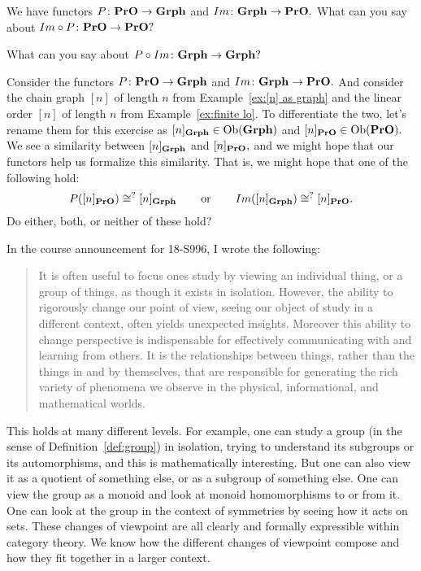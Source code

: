 \documentclass[../main/CT4S-EN-RU]{subfiles}
\begin{document}
\begin{exerciseRUS}
\end{exerciseRUS}

\begin{exerciseENG}
We have functors $P\colon{\mathbf{PrO}}\rightarrow{\mathbf{Grph}}$ and $Im\colon{\mathbf{Grph}}\rightarrow{\mathbf{PrO}}.$
\sexc What can you say about $Im\circ P\colon{\mathbf{PrO}}\rightarrow{\mathbf{PrO}}?$
\item What can you say about $P\circ Im\colon{\mathbf{Grph}}\rightarrow{\mathbf{Grph}}?$
\endsexc
\end{exerciseENG}

\begin{exerciseRUS}
\end{exerciseRUS}

\begin{exerciseENG}
Consider the functors $P\colon{\mathbf{PrO}}\rightarrow{\mathbf{Grph}}$ and $Im\colon{\mathbf{Grph}}\rightarrow{\mathbf{PrO}}.$ And consider the chain graph $[n]$ of length $n$ from Example~\ref{ex:[n] as graph} and the linear order $[n]$ of length $n$ from Example~\ref{ex:finite lo}. To differentiate the two, let's rename them for this exercise as $[n]_{{\mathbf{Grph}}}\in\operatorname{Ob}({\mathbf{Grph}})$ and $[n]_{{\mathbf{PrO}}}\in\operatorname{Ob}({\mathbf{PrO}}).$ We see a similarity between $[n]_{{\mathbf{Grph}}}$ and $[n]_{{\mathbf{PrO}}},$ and we might hope that our functors help us formalize this similarity. That is, we might hope that one of the following hold: 
$$P([n]_{{\mathbf{PrO}}})\cong^? [n]_{{\mathbf{Grph}}}\hspace{.3in}\textnormal{or}\hspace{.3in} Im([n]_{{\mathbf{Grph}}})\cong^? [n]_{{\mathbf{PrO}}}.$$ 
Do either, both, or neither of these hold?
\end{exerciseENG}

\begin{exerciseRUS}
\end{exerciseRUS}

\begin{remarkENG}
In the course announcement for 18-S996, I wrote the following:
\begin{quote}
It is often useful to focus ones study by viewing an individual thing, or a group of things, as though it exists in isolation. However, the ability to rigorously change our point of view, seeing our object of study in a different context, often yields unexpected insights. Moreover this ability to change perspective is indispensable for effectively communicating with and learning from others. It is the relationships between things, rather than the things in and by themselves, that are responsible for generating the rich variety of phenomena we observe in the physical, informational, and mathematical worlds.
\end{quote}
This holds at many different levels. For example, one can study a group (in the sense of Definition~\ref{def:group}) in isolation, trying to understand its subgroups or its automorphisms, and this is mathematically interesting. But one can also view it as a quotient of something else, or as a subgroup of something else. One can view the group as a monoid and look at monoid homomorphisms to or from it. One can look at the group in the context of symmetries by seeing how it acts on sets. These changes of viewpoint are all clearly and formally expressible within category theory. We know how the different changes of viewpoint compose and how they fit together in a larger context. 
\end{remarkENG}
\end{document}

